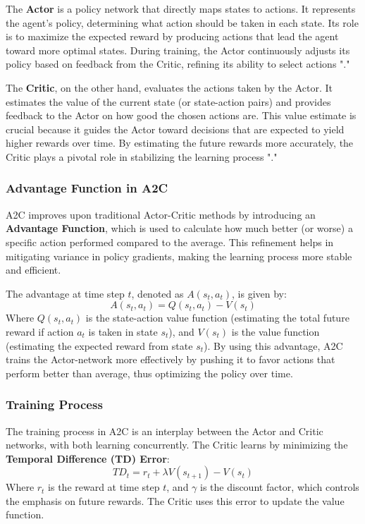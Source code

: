 The \textbf{Actor} is a policy network that directly maps states to actions. It represents the agent's policy, determining what action should be taken in each state. Its role is to maximize the expected reward by producing actions that lead the agent toward more optimal states. During training, the Actor continuously adjusts its policy based on feedback from the Critic, refining its ability to select actions "\cite{openai_a2c}."

The \textbf{Critic}, on the other hand, evaluates the actions taken by the Actor. It estimates the value of the current state (or state-action pairs) and provides feedback to the Actor on how good the chosen actions are. This value estimate is crucial because it guides the Actor toward decisions that are expected to yield higher rewards over time. By estimating the future rewards more accurately, the Critic plays a pivotal role in stabilizing the learning process "\cite{openai_a2c}."

\subsubsection*{Advantage Function in A2C}

A2C improves upon traditional Actor-Critic methods by introducing an \textbf{Advantage Function}, which is used to calculate how much better (or worse) a specific action performed compared to the average. This refinement helps in mitigating variance in policy gradients, making the learning process more stable and efficient.

The advantage at time step $t$, denoted as $A(s_t, a_t)$, is given by:
\[A(s_t, a_t) = Q(s_t, a_t) - V(s_t)\]
Where $Q(s_t, a_t)$ is the state-action value function (estimating the total future reward if action $a_t$ is taken in state $s_t$), and $V(s_t)$ is the value function (estimating the expected reward from state $s_t$). By using this advantage, A2C trains the Actor-network more effectively by pushing it to favor actions that perform better than average, thus optimizing the policy over time.

\subsubsection*{Training Process}

The training process in A2C is an interplay between the Actor and Critic networks, with both learning concurrently. The Critic learns by minimizing the \textbf{Temporal Difference (TD) Error}:
\[TD_t = r_t + \lambda V(s_{t+1})-V(s_t)\]
Where $r_t$ is the reward at time step $t$, and $\gamma$ is the discount factor, which controls the emphasis on future rewards. The Critic uses this error to update the value function.

